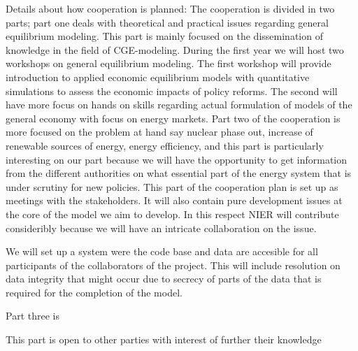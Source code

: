 Details about how cooperation is planned:
The cooperation is divided in two parts; part one deals with theoretical and practical issues regarding general equilibrium modeling. This part is mainly focused on the dissemination of knowledge in the field of CGE-modeling. During the first year we will host two workshops on general equilibrium modeling. The first workshop will provide introduction to applied economic equilibrium models with quantitative simulations to assess the economic impacts of policy reforms. The second will have more focus on hands on skills regarding actual formulation of models of the general economy with focus on energy markets.
Part two of the cooperation is more focused on the problem at hand say nuclear phase out, increase of renewable sources of energy, energy efficiency, and this part is particularly interesting on our part because we will have the opportunity to get information from the different authorities on what essential part of the energy system that is under scrutiny for new policies. This part of the cooperation plan is set up as meetings with the stakeholders. It will also contain pure development issues at the core of the model we aim to develop. In this respect NIER will contribute consideribly because we will have an intricate collaboration on the issue.

We will set up a system were the code base and data are accesible for all participants of the collaborators of the project. This will include resolution on data integrity that might occur due to secrecy of parts of the data that is required for the completion of the model.


Part three is

This part is open to other parties with interest of further their knowledge